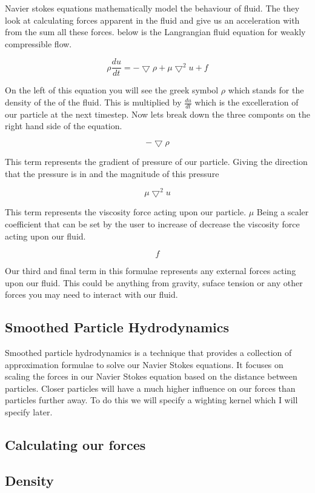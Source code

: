 Navier stokes equations mathematically model the behaviour of fluid. The they look at calculating forces apparent in the fluid and give us an acceleration with from the sum all these forces. below is the Langrangian fluid equation for weakly compressible flow.\par
 \[ \rho\frac{du}{dt}=-\bigtriangledown\rho+\mu\bigtriangledown^2 u + f \]\par
 On the left of this equation you will see the greek symbol $\rho$ which stands for the density of the of the fluid. This is multiplied by $\frac{du}{dt}$ which is the excelleration of our particle at the next timestep. Now lets break down the three componts on the right hand side of the equation.\par
 \[ -\bigtriangledown\rho \]\par
 This term represents the gradient of pressure of our particle. Giving the direction that the pressure is in and the magnitude of this pressure\par
 \[ \mu\bigtriangledown^2 u \]\par
This term represents the viscosity force acting upon our particle. $\mu$ Being a scaler coefficient that can be set by the user to increase of decrease the viscosity force acting upon our fluid.\par
 \[ f \]\par
Our third and final term in this formulae represents any external forces acting upon our fluid. This could be anything from gravity, suface tension or any other forces you may need to interact with our fluid.

\subsection*{Smoothed Particle Hydrodynamics }

Smoothed particle hydrodynamics is a technique that provides a collection of approximation formulae to solve our Navier Stokes equations. It focuses on scaling the forces in our Navier Stokes equation based on the distance between particles. Closer particles will have a much higher influence on our forces than particles further away. To do this we will specify a wighting kernel which I will specify later.

\subsection*{Calculating our forces }

\subsection*{Density }

